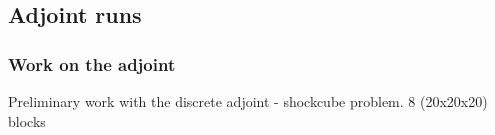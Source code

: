 \documentclass{beamer}
\begin{document}
\subsection{Adjoint runs}
\begin{frame}
\frametitle{Work on the adjoint}
\begin{minipage}[t][1\textheight]{1\textwidth}
\vspace{-20pt}
\begin{exampleblock}{Preliminary work with the discrete adjoint - shockcube problem. 8 (20x20x20) blocks}
\vspace{-20pt}
\tiny
\begin{figure}
\label{fig:Blkshockedcube}
\centering
{}

\end{figure}
\end{exampleblock}
\end{minipage}
\end{frame}
\end{document}
